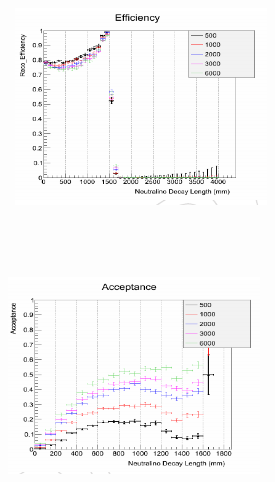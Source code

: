 \begin{minipage}{0.90\linewidth} 
\begin{center}
\mbox{
\includegraphics[height=7cm, width=0.5\textwidth]{THESISPLOTS/SignalReconstructionEfficiency.png}
\includegraphics[height=7cm, width=0.5\textwidth]{THESISPLOTS/SignalReconstructionAcceptance.png}
}
\label{fig:EffAcc}
\end{center}
\end{minipage}
